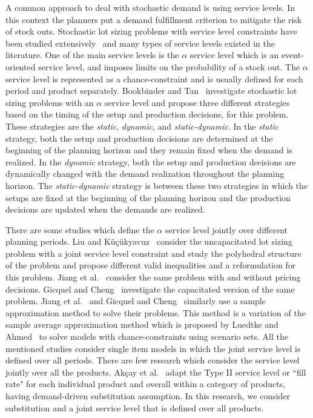 \documentclass[10pt]{article}
\begin{document}
A common approach to deal with stochastic demand is using service levels. In this context the planners put  a demand fulfillment criterion to mitigate the risk of stock outs.  Stochastic lot sizing problems with service level constraints have been studied extensively~\cite{tempelmeier2007stochastic} and many types of service levels existed in the literature. One of the main service levels is the $\alpha$ service level which is an event-oriented service level, and imposes limits on the probability of a stock out. The $\alpha$ service level is represented as a chance-constraint and is usually defined for each period and product separately. Bookbinder and Tan~\cite{bookbinder1988strategies} investigate stochastic lot sizing problems with an $\alpha$ service level and propose three different strategies based on the timing of the setup and production decisions, for this problem. These strategies are the \textit{static}, \textit{dynamic}, and \textit{static-dynamic}. In the \textit{static} strategy, both the setup and production decisions are determined at the beginning of the planning horizon and they remain fixed when the demand is realized. In the \textit{dynamic} strategy, both the setup and production decisions are dynamically changed with the demand realization throughout the planning horizon. The \textit{static-dynamic} strategy is between these two strategies in which the setups are fixed at the beginning of the planning horizon and the production decisions are updated when the demands are realized. %

There are some studies which define the $\alpha$ service level jointly over different planning periods. Liu and K{\"u}{\c{c}}{\"u}kyavuz~\cite{liu2018polyhedral} consider the uncapacitated lot sizing problem with a joint service level constraint and study the polyhedral structure of the problem and propose different valid inequalities and a reformulation for this problem. Jiang et al.~\cite{jiang2017production} consider the same problem with and without pricing decisions. Gicquel and Cheng~\cite{gicquel2018joint} investigate the capacitated version of the same problem. Jiang et al.~\cite{jiang2017production} and Gicquel and Cheng~\cite{gicquel2018joint} similarly use a sample approximation method to solve their problems. This method is a variation of the sample average approximation method which is proposed by Luedtke and Ahmed~\cite{luedtke2008sample} to solve models with chance-constraints using scenario sets. All the mentioned studies consider single item models in which the joint service level is defined over all periods. There are few research which consider the service level jointly over all the products. Akçay et al.~\cite{akccaycategory} adapt the Type II service level or ``fill rate" for each individual product and overall within a category of products, having demand-driven substitution assumption. In this research, we consider substitution and a joint service level that is defined over all products.
\end{document}
